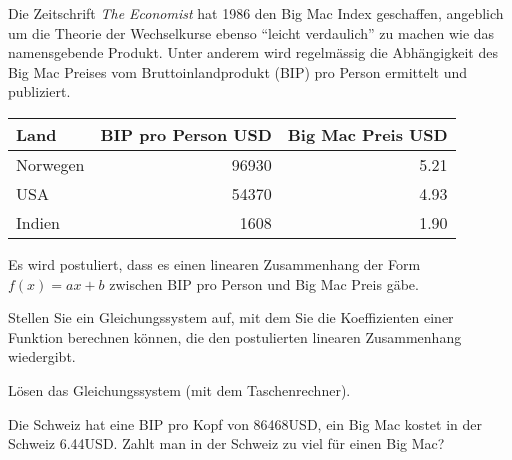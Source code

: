 Die Zeitschrift {\em The Economist} hat 1986 den Big Mac Index geschaffen,
angeblich um die Theorie der Wechselkurse ebenso ``leicht verdaulich''
zu machen wie das namensgebende Produkt.
Unter anderem wird regelmässig die Abhängigkeit des Big Mac Preises
vom Bruttoinlandprodukt (BIP) pro Person ermittelt und publiziert.
\begin{center}
\begin{tabular}{|l|r|r|}
\hline
Land&BIP pro Person USD&Big Mac Preis USD\\
\hline
Norwegen&96930&5.21\\
USA&54370&4.93\\
Indien&1608&1.90\\
\hline
\end{tabular}
\end{center}
Es wird postuliert, dass es einen linearen Zusammenhang der Form $f(x)=ax+b$
zwischen BIP pro Person und Big Mac Preis gäbe.


\begin{teilaufgaben}
\item Stellen Sie ein Gleichungssystem auf, mit dem Sie die Koeffizienten
einer Funktion berechnen können, die den postulierten linearen Zusammenhang
wiedergibt.
\item Lösen das Gleichungssystem (mit dem Taschenrechner).
\item Die Schweiz hat eine BIP pro Kopf von 86468USD, ein Big Mac kostet
in der Schweiz 6.44USD.
Zahlt man in der Schweiz zu viel für einen Big Mac?
\end{teilaufgaben}

